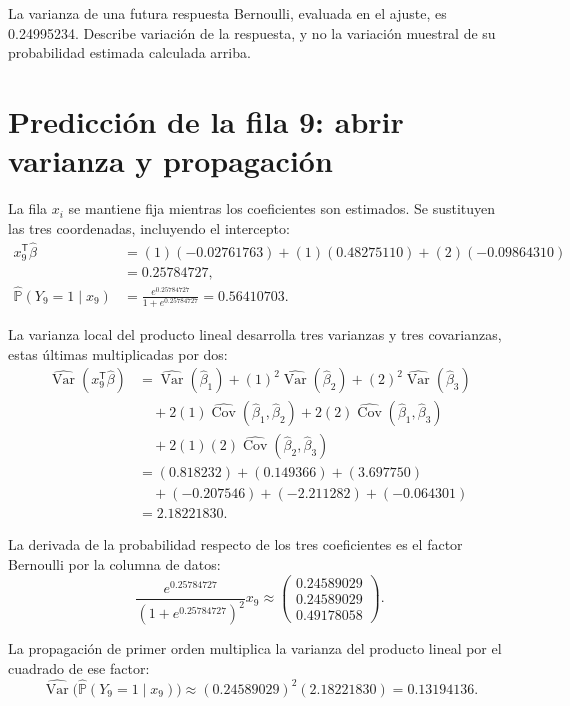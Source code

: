 \documentclass[11pt,a4paper]{article}
\newcommand{\Prob}{\mathbb P}
\newcommand{\T}{^{\mathsf T}}
\DeclareMathOperator{\Var}{Var}
\DeclareMathOperator{\Cov}{Cov}
\begin{document}
La varianza de una futura respuesta Bernoulli,
evaluada en el ajuste, es 0.24995234.
Describe variación de la respuesta, y no la variación
muestral de su probabilidad estimada calculada arriba.
\endgroup

\clearpage
\section{Predicción de la fila 9: abrir varianza y propagación}\label{logit118}
\begingroup\small
\setlength{\abovedisplayskip}{4pt}\setlength{\belowdisplayskip}{4pt}
La fila \(x_i\) se mantiene fija mientras los coeficientes
son estimados. Se sustituyen las tres coordenadas,
incluyendo el intercepto:
\[
\begin{aligned}
x_{9}\T\widehat\beta&=(1)(-0.02761763)+(1)(0.48275110)+(2)(-0.09864310)\\&=0.25784727,\\\widehat{\Prob}(Y_{9}=1\mid x_{9})&=\frac{e^{0.25784727}}{1+e^{0.25784727}}=0.56410703.\end{aligned}
\]

La varianza local del producto lineal desarrolla tres varianzas
y tres covarianzas, estas últimas multiplicadas por dos:
\[
\begin{aligned}
\widehat{\Var}(x_{9}\T\widehat\beta)&=\widehat{\Var}(\widehat\beta_1)+(1)^2\widehat{\Var}(\widehat\beta_2)+(2)^2\widehat{\Var}(\widehat\beta_3)\\&\quad+2(1)\widehat{\Cov}(\widehat\beta_1,\widehat\beta_2)+2(2)\widehat{\Cov}(\widehat\beta_1,\widehat\beta_3)\\&\quad+2(1)(2)\widehat{\Cov}(\widehat\beta_2,\widehat\beta_3)\\&=(0.818232)+(0.149366)+(3.697750)\\&\quad+(-0.207546)+(-2.211282)+(-0.064301)\\&=2.18221830.\end{aligned}
\]

La derivada de la probabilidad respecto de los tres coeficientes
es el factor Bernoulli por la columna de datos:
\[
\frac{e^{0.25784727}}{(1+e^{0.25784727})^2}x_{9}\approx\begin{pmatrix}0.24589029\\0.24589029\\0.49178058\end{pmatrix}.
\]

La propagación de primer orden multiplica la varianza del
producto lineal por el cuadrado de ese factor:
\[
\widehat{\Var}\bigl(\widehat{\Prob}(Y_{9}=1\mid x_{9})\bigr)\approx(0.24589029)^2(2.18221830)=0.13194136.
\]
\end{document}
